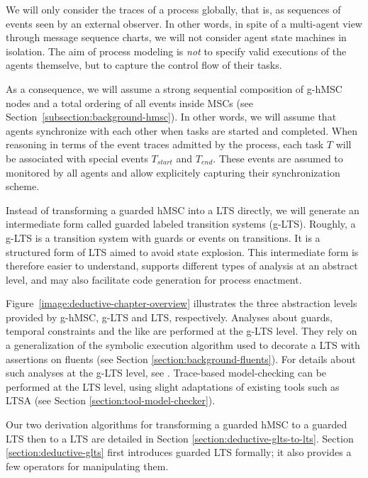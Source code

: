 We will only consider the traces of a process globally, that is, as sequences of events seen by an external observer. In other words, in spite of a multi-agent view through message sequence charts, we will not consider agent state machines in isolation. The aim of process modeling is \emph{not} to specify valid executions of the agents themselve, but to capture the control flow of their tasks. 

As a consequence, we will assume a strong sequential composition of g-hMSC nodes and a total ordering of all events inside MSCs (see Section~\ref{subsection:background-hmsc}). In other words, we will assume that agents synchronize with each other when tasks are started and completed. When reasoning in terms of the event traces admitted by the process, each task $T$ will be associated with special events $T_{start}$ and $T_{end}$. These events are assumed to monitored by all agents and allow explicitely capturing their synchronization scheme.

Instead of transforming a guarded hMSC into a LTS directly, we will generate an intermediate form called guarded labeled transition systems (g-LTS). Roughly, a g-LTS is a transition system with guards or events on transitions. It is a structured form of LTS aimed to avoid state explosion. This intermediate form is therefore easier to understand, supports different types of analysis at an abstract level, and may also facilitate code generation for process enactment. 

Figure~\ref{image:deductive-chapter-overview} illustrates the three abstraction levels provided by g-hMSC, g-LTS and LTS, respectively. Analyses about guards, temporal constraints and the like are performed at the g-LTS level. They rely on a generalization of the symbolic execution algorithm used to decorate a LTS with assertions on fluents (see Section \ref{section:background-fluents}). For details about such analyses at the g-LTS level, see \cite{Damas:2011}. Trace-based model-checking can be performed at the LTS level, using slight adaptations of existing tools such as LTSA \cite{Magee:1999} (see Section \ref{section:tool-model-checker}).

Our two derivation algorithms for transforming a guarded hMSC to a guarded LTS then to a LTS are detailed in Section \ref{section:deductive-glts-to-lts}. Section \ref{section:deductive-glts} first introduces guarded LTS formally; it also provides a few operators for manipulating them.

